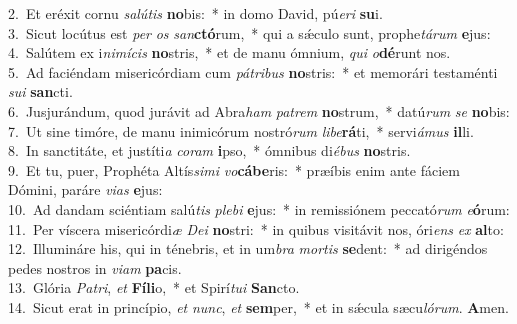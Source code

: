 {2.~}Et eréxit cornu \textit{sa}\textit{lú}\textit{tis} \textbf{no}bis:~* in domo David, pú\textit{e}\textit{ri} \textbf{su}i.\\
{3.~}Sicut locútus est \textit{per} \textit{os} \textit{san}\textbf{ctó}rum,~* qui a sǽculo sunt, prophe\textit{tá}\textit{rum} \textbf{e}jus:\\
{4.~}Salútem ex i\textit{ni}\textit{mí}\textit{cis} \textbf{no}stris,~* et de manu ómnium, \textit{qui} \textit{o}\textbf{dé}runt nos.\\
{5.~}Ad faciéndam misericórdiam cum \textit{pá}\textit{tri}\textit{bus} \textbf{no}stris:~* et memorári testaménti \textit{su}\textit{i} \textbf{san}cti.\\
{6.~}Jusjurándum, quod jurávit ad Abra\textit{ham} \textit{pa}\textit{trem} \textbf{no}strum,~* datú\textit{rum} \textit{se} \textbf{no}bis:\\
{7.~}Ut sine timóre, de manu inimicórum nostró\textit{rum} \textit{li}\textit{be}\textbf{rá}ti,~* servi\textit{á}\textit{mus} \textbf{il}li.\\
{8.~}In sanctitáte, et justíti\textit{a} \textit{co}\textit{ram} \textbf{i}pso,~* ómnibus di\textit{é}\textit{bus} \textbf{no}stris.\\
{9.~}Et tu, puer, Prophéta Altís\textit{si}\textit{mi} \textit{vo}\textbf{cá}\textbf{be}ris:~* præíbis enim ante fáciem Dómini, paráre \textit{vi}\textit{as} \textbf{e}jus:\\
{10.~}Ad dandam sciéntiam salú\textit{tis} \textit{ple}\textit{bi} \textbf{e}jus:~* in remissiónem peccató\textit{rum} \textit{e}\textbf{ó}rum:\\
{11.~}Per víscera misericórdi\textit{æ} \textit{De}\textit{i} \textbf{no}stri:~* in quibus visitávit nos, óri\textit{ens} \textit{ex} \textbf{al}to:\\
{12.~}Illumináre his, qui in ténebris, et in um\textit{bra} \textit{mor}\textit{tis} \textbf{se}dent:~* ad dirigéndos pedes nostros in \textit{vi}\textit{am} \textbf{pa}cis.\\
{13.~}Glória \textit{Pa}\textit{tri}, \textit{et} \textbf{Fí}\textbf{li}o,~* et Spirí\textit{tu}\textit{i} \textbf{San}cto.\\
{14.~}Sicut erat in princípio, \textit{et} \textit{nunc}, \textit{et} \textbf{sem}per,~* et in sǽcula sæcu\textit{ló}\textit{rum}. \textbf{A}men.\\
